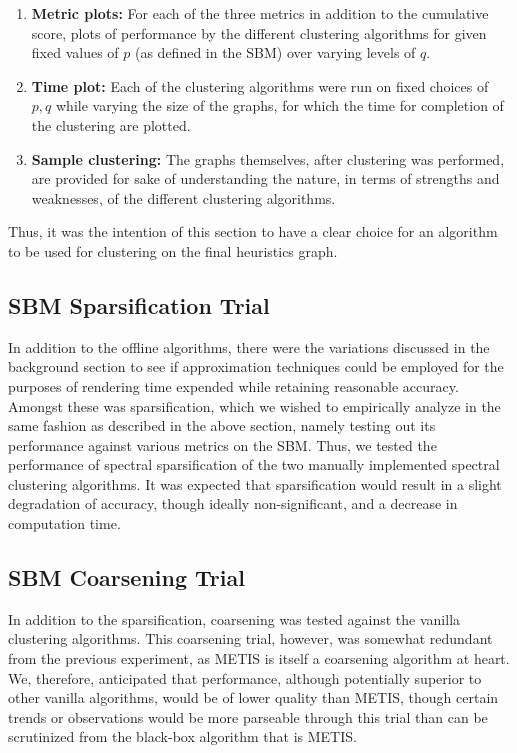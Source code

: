\documentclass{article}
\begin{document}
\begin{enumerate}
    \item \textbf{Metric plots:} For each of the three metrics in addition to the cumulative score, plots of performance by the different clustering algorithms for given fixed values of $p$ (as defined in the SBM) over varying levels of $q$. 
    \item \textbf{Time plot:} Each of the clustering algorithms were run on fixed choices of $p,q$ while varying the size of the graphs, for which the time for completion of the clustering are plotted.
    \item \textbf{Sample clustering:} The graphs themselves, after clustering was performed, are provided for sake of understanding the nature, in terms of strengths and weaknesses, of the different clustering algorithms.
\end{enumerate}

Thus, it was the intention of this section to have a clear choice for an algorithm to be used for clustering on the final heuristics graph.

\subsection{SBM Sparsification Trial}
In addition to the offline algorithms, there were the variations discussed in the background section to see if approximation techniques could be employed for the purposes of rendering time expended while retaining reasonable accuracy. Amongst these was sparsification, which we wished to empirically analyze in the same fashion as described in the above section, namely testing out its performance against various metrics on the SBM. Thus, we tested the performance of spectral sparsification of the two manually implemented spectral clustering algorithms. It was expected that sparsification would result in a slight degradation of accuracy, though ideally non-significant, and a decrease in computation time.

\subsection{SBM Coarsening Trial}
In addition to the sparsification, coarsening was tested against the vanilla clustering algorithms. This coarsening trial, however, was somewhat redundant from the previous experiment, as METIS is itself a coarsening algorithm at heart. We, therefore, anticipated that performance, although potentially superior to other vanilla algorithms, would be of lower quality than METIS, though certain trends or observations would be more parseable through this trial than can be scrutinized from the black-box algorithm that is METIS.
\end{document}

